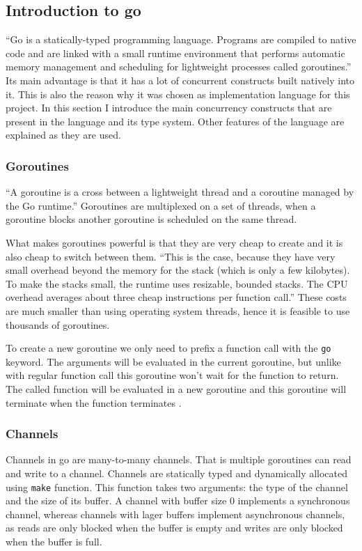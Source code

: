 \documentclass[12pt,a4paper]{article}
\begin{document}
\subsection{Introduction to go}
``Go is a statically-typed programming language. Programs are compiled 
to native code and are linked with a small runtime environment that performs 
automatic memory management and scheduling for lightweight processes called 
goroutines.'' \cite[2]{whitehead} Its main advantage is 
that it has a lot of concurrent constructs built natively into it.
This is also the reason why it was chosen as implementation language 
for this project.
In this section I introduce the main concurrency constructs that are
present in the language and its type system. Other features
of the language are explained as they are used.

\subsubsection{Goroutines}
``A goroutine is a cross between a lightweight thread and a coroutine
managed by the Go runtime.'' \cite[2]{whitehead} Goroutines are multiplexed
on a set of threads, when a goroutine blocks another goroutine is scheduled
on the same thread. 

What makes goroutines powerful is that they are very cheap to create and 
it is also cheap to switch between them. ``This is the case, because they 
have very small overhead beyond the memory for the stack (which is only 
a few kilobytes). To make the stacks small, the runtime uses resizable, 
bounded stacks. The CPU overhead averages about three cheap 
instructions per function call.'' \cite{FAQ} These costs are much smaller
than using operating system threads, hence it is feasible to use thousands
of goroutines.

To create a new goroutine we only need to prefix a function call with
the \texttt{go} keyword. The arguments will be evaluated in the current
goroutine, but unlike with regular function call this goroutine won't
wait for the function to return. The called 
function will be evaluated in a new goroutine and this goroutine will 
terminate when the function terminates \cite{GoDocumentation}.

\subsubsection{Channels}
Channels in go are many-to-many channels. That is multiple goroutines can
read and write to a channel. Channels are statically typed and
dynamically allocated using \texttt{make} function. This function takes 
two arguments: the type of the channel and the size of its buffer.
A channel with buffer size 0 implements a synchronous channel, whereas 
channels with lager buffers implement asynchronous channels, as reads
are only blocked when the buffer is empty and writes are only blocked
when the buffer is full.
\end{document}
